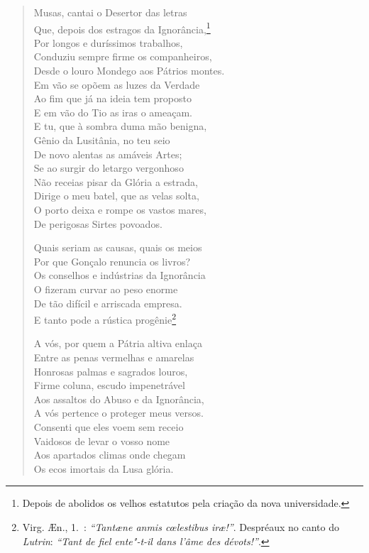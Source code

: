 \begin{verse}
Musas, cantai o Desertor das letras\\
Que, depois dos estragos da Ignorância,\footnote{ Depois de abolidos os velhos estatutos pela criação da nova universidade.} \\		\index{\Ignor}
Por longos e duríssimos trabalhos, \\
Conduziu sempre firme os companheiros, \\
Desde o louro Mondego aos Pátrios montes. \\		\index{\Monde}
Em vão se opõem as luzes da Verdade \\
Ao fim que já na ideia tem proposto \\
E em vão do Tio as iras o ameaçam. \\[10pt]

E tu, que à sombra duma mão benigna,\\
Gênio da Lusitânia, no teu seio\\
De novo alentas as amáveis Artes;\\
Se ao surgir do letargo vergonhoso\\
Não receias pisar da Glória a estrada,\\
Dirige o meu batel, que as velas solta,\\
O porto deixa e rompe os vastos mares,\\
De perigosas Sirtes povoados. %

Quais seriam as causas, quais os meios\\
Por que Gonçalo renuncia os livros?\\
Os conselhos e indústrias da Ignorância\\	\index{\Ignor}		\index{\Indus}
O fizeram curvar ao peso enorme\\
De tão difícil e arriscada empresa.\\
E tanto pode a rústica progênie\footnote{ Virg. \AE n., 1.~:
\textit{``Tant\ae ne anmis c\oe lestibus ir\ae !''}. Despréaux no canto  do
\textit{Lutrin}: \textit{``Tant de fiel ente"-t-il dans l'âme des dévots!''}.} 
\\[10pt]		\index{\Lutri}

A vós, por quem a Pátria altiva enlaça\\
Entre as penas vermelhas e amarelas\\
Honrosas palmas e sagrados louros,\\		\index{\Lour}
Firme coluna, escudo impenetrável\\
Aos assaltos do Abuso e da Ignorância,\\			\index{\Ignor}
A vós pertence o proteger meus versos.\\
Consenti que eles voem sem receio\\
Vaidosos de levar o vosso nome\\
Aos apartados climas onde chegam\\
Os ecos imortais da Lusa glória. \\[10pt]



\end{verse}
